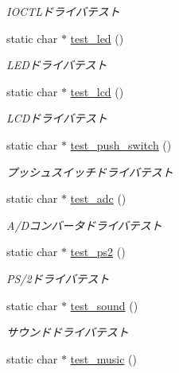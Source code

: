 \begin{DoxyCompactItemize}
\begin{DoxyCompactList}\small\item\em I\+O\+C\+T\+Lドライバテスト \end{DoxyCompactList}\item 
static char $\ast$ \hyperlink{test_8h_a38b2597531d6d1e45414207f17fd0deb_a38b2597531d6d1e45414207f17fd0deb}{test\+\_\+led} ()
\begin{DoxyCompactList}\small\item\em L\+E\+Dドライバテスト \end{DoxyCompactList}\item 
static char $\ast$ \hyperlink{test_8h_a13f79636806047012a2ea964e4900942_a13f79636806047012a2ea964e4900942}{test\+\_\+lcd} ()
\begin{DoxyCompactList}\small\item\em L\+C\+Dドライバテスト \end{DoxyCompactList}\item 
static char $\ast$ \hyperlink{test_8h_a1f9df45f5d579406ea4ffb5d9d3d6a58_a1f9df45f5d579406ea4ffb5d9d3d6a58}{test\+\_\+push\+\_\+switch} ()
\begin{DoxyCompactList}\small\item\em プッシュスイッチドライバテスト \end{DoxyCompactList}\item 
static char $\ast$ \hyperlink{test_8h_a9a12ecf1356a7470997321c8a64ee7b7_a9a12ecf1356a7470997321c8a64ee7b7}{test\+\_\+adc} ()
\begin{DoxyCompactList}\small\item\em A/\+Dコンバータドライバテスト \end{DoxyCompactList}\item 
static char $\ast$ \hyperlink{test_8h_acf1fa7d64313a77314c05da8bebef6e6_acf1fa7d64313a77314c05da8bebef6e6}{test\+\_\+ps2} ()
\begin{DoxyCompactList}\small\item\em P\+S/2ドライバテスト \end{DoxyCompactList}\item 
static char $\ast$ \hyperlink{test_8h_a05b2818bcfa967ac105d6624ec854909_a05b2818bcfa967ac105d6624ec854909}{test\+\_\+sound} ()
\begin{DoxyCompactList}\small\item\em サウンドドライバテスト \end{DoxyCompactList}\item 
static char $\ast$ \hyperlink{test_8h_ab83bade3caf130990bf5516b6455e715_ab83bade3caf130990bf5516b6455e715}{test\+\_\+music} ()

\end{DoxyCompactItemize}
